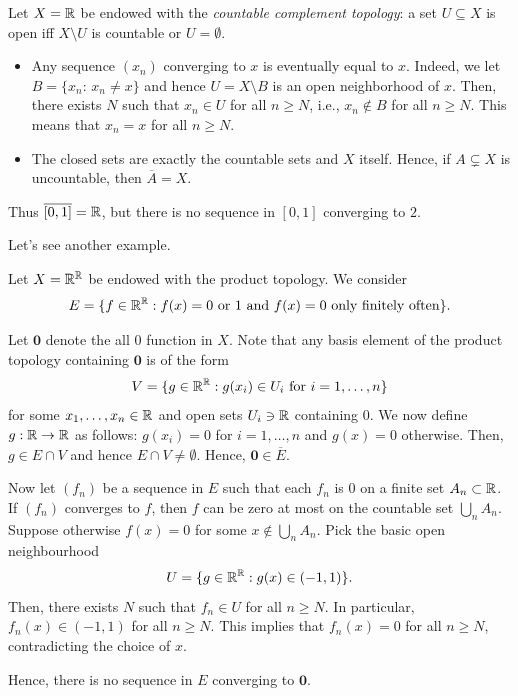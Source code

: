\begin{example}
Let $X=\mathbb{R}$ be endowed with the 
\emph{countable complement topology}: a set $U\subseteq X$ is open 
iff $X\setminus U$ is countable or $U=\emptyset$. 

\begin{itemize}
  \item Any sequence $(x_n)$ converging to $x$ is eventually equal to $x$.  
  Indeed, we let $B=\{x_n:\,x_n\neq x\}$ and hence $U=X\setminus B$ is an 
  open neighborhood of $x$. Then, there exists $N$ such that $x_n\in U$ for all
  $n\ge N$, i.e., $x_n\notin B$ for all $n\ge N$. This means that 
  $x_n=x$ for all $n\ge N$.
  \item The closed sets are exactly the countable sets and $X$ itself.  
  Hence, if $A\subsetneq X$ is uncountable, then 
  $\overline{A}=X$.
\end{itemize}

Thus $\overline{[0,1]}=\mathbb{R}$, but there is no sequence in $[0,1]$ converging to $2$.
\end{example}

Let's see another example.

\begin{example}
    Let $X=\mathbb{R}^{\mathbb{R}}$ be endowed with the product topology. We consider 
    $$E=\{f\in \mathbb{R}^{\mathbb{R}}:f(x)=0\text{ or }1\text{ and }f(x)=0\text{ only finitely often}\}.$$

    Let $\mathbf{0}$ denote the all 0 function in $X$. Note that any basis element of the product topology containing $\mathbf{0}$ is of the form
    $$V=\{g\in \mathbb{R}^{\mathbb{R}}:g(x_i)\in U_i\text{ for }i=1,\ldots,n\}$$
    for some $x_1,\ldots,x_n\in\mathbb{R}$ and open sets $U_i\ni\mathbb{R}$ containing $0$. We now define $g:\mathbb{R}\to \mathbb{R}$ as follows: $g(x_i)=0$ for $i=1,\ldots,n$ and $g(x)=0$ otherwise. Then, $g\in E\cap V$ and hence $E\cap V\neq\emptyset$. Hence, $\mathbf{0}\in\overline{E}$.
    
    Now let $(f_n)$ be a sequence in $E$ such that each $f_n$ is 0 on a finite set $A_n\subset \mathbb{R}$. If $(f_n)$ converges to $f$, then $f$ can be zero at most on the countable set $\bigcup_{n} A_n$. Suppose otherwise $f(x)=0$ for some $x\notin \bigcup_n A_n$. Pick the basic open neighbourhood
    $$U=\{g\in \mathbb{R}^{\mathbb{R}}:g(x)\in (-1,1)\}.$$
    Then, there exists $N$ such that $f_n\in U$ for all $n\ge N$. In particular, $f_n(x)\in (-1,1)$ for all $n\ge N$. This implies that $f_n(x)=0$ for all $n\ge N$, contradicting the choice of $x$.
    
    Hence, there is no sequence in $E$ converging to $\mathbf{0}$.
\end{example}

